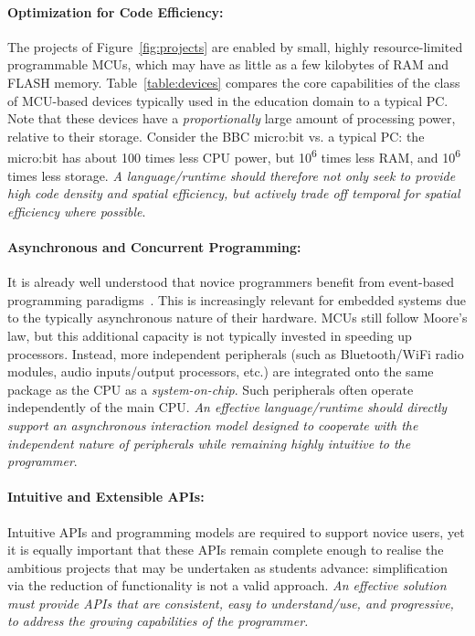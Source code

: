 \paragraph{Optimization for Code Efficiency:}
The projects of Figure~\ref{fig:projects} are enabled by small, highly resource-limited programmable MCUs, which may have as little as a few kilobytes of RAM and FLASH memory.
Table~\ref{table:devices} compares the core capabilities of the class of MCU-based devices typically used in the education domain to a typical PC. Note that these devices have a \emph{proportionally} large amount of processing power, relative to their storage. Consider the BBC micro:bit vs. a typical PC: the micro:bit has about 100 times less CPU power, but 10\textsuperscript{6} times less RAM, and 10\textsuperscript{6} times less storage. \emph{A language/runtime should therefore not only seek to provide high code density and spatial efficiency, but actively trade off temporal for spatial efficiency where possible}.

\paragraph{Asynchronous and Concurrent Programming:}
It is already well understood that novice programmers benefit from event-based programming paradigms~\cite{maloney2008programming,maloney2010scratch,turbak2014events}. This is increasingly relevant for embedded systems due to the typically asynchronous nature of their hardware. MCUs still follow Moore's law,
but this additional capacity is not typically invested in speeding
up processors. Instead, more independent peripherals (such as Bluetooth/WiFi radio modules, audio inputs/output processors, etc.) are integrated onto the same package as the CPU as a \emph{system-on-chip}. Such peripherals often operate independently of the main CPU. \emph{An effective language/runtime should directly support an asynchronous interaction model designed to cooperate with the independent nature of peripherals while remaining highly intuitive to the programmer}.

\paragraph{Intuitive and Extensible APIs:}
Intuitive APIs and programming models are required to support novice users, yet it is equally important that these APIs remain complete enough to realise the ambitious projects that may be undertaken as students advance: simplification via the reduction of functionality is not a valid approach.
\emph{An effective solution must provide APIs that are consistent, easy to understand/use, and progressive, to address the growing capabilities of the programmer.}

